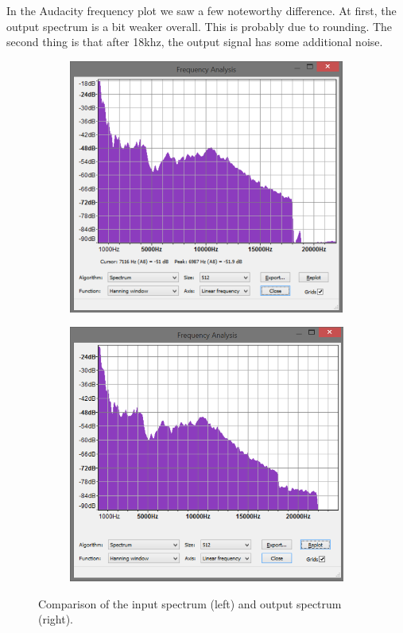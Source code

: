 \documentclass[a4paper,twoside,11pt, fleqn]{article}
\begin{document}
In the Audacity frequency plot we saw a few noteworthy difference. At first, the output spectrum is a bit weaker overall. This is probably due to rounding. The second thing is that after 18khz, the output signal has some additional noise. 

\begin{figure}[h]
	\begin{subfigure}[b]{0.45\textwidth}	
		\includegraphics[scale=0.5]{Images/simulation_frequencyspectrum_input.png}
	\end{subfigure}
	\begin{subfigure}[b]{0.45\textwidth}	
		\includegraphics[scale=0.5]{Images/simulation_frequencyspectrum_output.png}
	\end{subfigure}
    \caption{Comparison of the input spectrum (left) and output spectrum (right).}
\end{figure}
\end{document}
